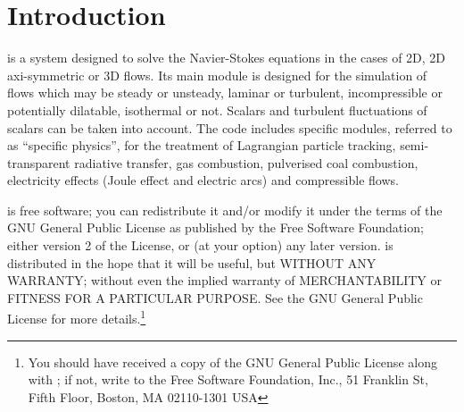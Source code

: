 
%
%
%
%


\nopagebreak
\section{Introduction}

\CS is a system designed to solve the Navier-Stokes
equations in the cases of 2D, 2D axi-symmetric or 3D flows. Its main module is
designed for the simulation of flows which may be steady or
unsteady, laminar or turbulent, incompressible or potentially dilatable,
isothermal or not. Scalars and turbulent fluctuations of scalars can be taken into
account. The code includes specific modules, referred to as ``specific physics'',
for the treatment of Lagrangian particle tracking, semi-transparent radiative transfer,
gas combustion, pulverised coal combustion,
electricity effects (Joule effect and electric arcs) and compressible flows.

\CS is free software; you can redistribute it
and/or modify it under the terms of the GNU General Public License
as published by the Free Software Foundation; either version 2 of
the License, or (at your option) any later version.
\CS is distributed in the hope that it will be
useful, but WITHOUT ANY WARRANTY; without even the implied warranty
of MERCHANTABILITY or FITNESS FOR A PARTICULAR PURPOSE.  See the
GNU General Public License for more details.\footnote{You should have
received a copy of the GNU General Public License
along with \CS; if not, write to the
Free Software Foundation, Inc.,
51 Franklin St, Fifth Floor,
Boston, MA  02110-1301  USA}


